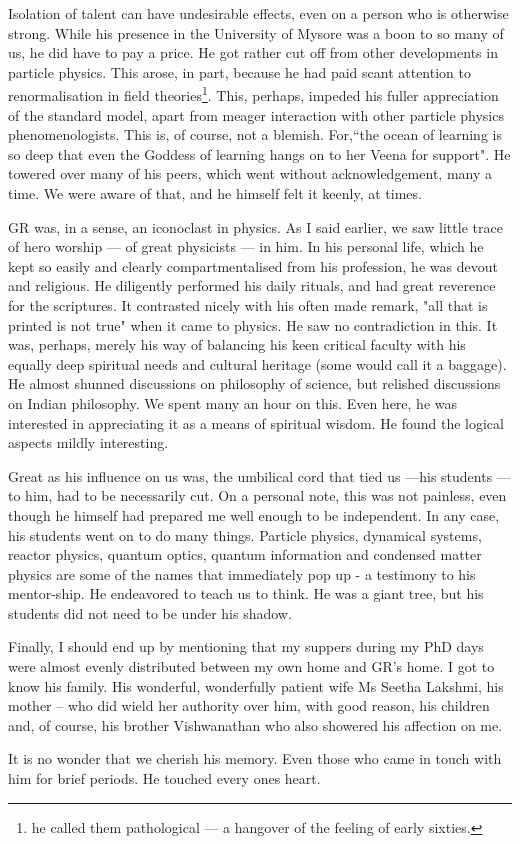 Isolation of talent can have undesirable effects, even on a person who 
is otherwise strong. While his presence in the University of Mysore was 
a boon to so many of us, he did have to pay a price. He got rather cut 
off from other developments in particle physics. This arose, in part, 
because he had paid scant attention to renormalisation in field 
theories\footnote{he called them pathological --- a hangover of the 
feeling of early sixties.}. This, perhaps, impeded his fuller 
appreciation of the standard model, apart from meager interaction with 
other particle physics phenomenologists. This is, of course, not a 
blemish. For,``the ocean of learning is so deep that even the Goddess of 
learning hangs on to her Veena for support". He towered over many of his 
peers, which went without acknowledgement, many a time. We were aware of 
that, and he himself felt it keenly, at times.

GR was, in a sense, an iconoclast in physics. As I said earlier, we saw 
little trace of hero worship — of great physicists — in him. In his 
personal life, which he kept so easily and clearly compartmentalised 
from his profession, he was devout and religious. He diligently 
performed his daily rituals, and had great reverence for the scriptures. 
It contrasted nicely with his often made remark, "all that is printed is 
not true" when it came to physics. He saw no contradiction in this. It 
was, perhaps, merely his way of balancing his keen critical faculty with 
his equally deep spiritual needs and cultural heritage (some would call 
it a baggage).  He almost shunned discussions on philosophy of science, 
but relished discussions on Indian philosophy. We spent many an hour on 
this. Even here, he was interested in appreciating it as a means of 
spiritual wisdom. He found the logical aspects mildly interesting.


Great as his influence on us was, the umbilical cord that tied us ---his 
students ---to him, had to be necessarily cut. On a personal note, this 
was not painless, even though he himself had prepared me well enough to 
be independent. In any case, his students went on to do many things. 
Particle physics, dynamical systems, reactor physics, quantum optics, 
quantum information and condensed matter physics are some of the names 
that immediately pop up - a testimony to his mentor-ship. He endeavored 
to teach us to think. He was a giant tree, but his students did not need 
to be under his shadow.

Finally, I should end up by mentioning that my suppers during my PhD 
days were almost evenly distributed between my own home and GR's home. I 
got to know his family. His wonderful, wonderfully patient wife Ms 
Seetha Lakshmi, his mother -- who did wield her authority over him, with 
good reason, his children and, of course, his brother Vishwanathan who 
also showered his affection on me.

It is no wonder that we cherish his memory. Even those who came in touch 
with him for brief periods. He touched every ones heart.




